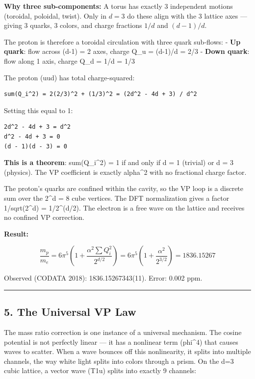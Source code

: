 \documentclass[
]{article}
\begin{document}
\textbf{Why three sub-components:} A torus has exactly 3 independent
motions (toroidal, poloidal, twist). Only in \(d=3\) do these align with
the 3 lattice axes --- giving 3 quarks, 3 colors, and charge fractions
\(1/d\) and \((d-1)/d\).

The proton is therefore a toroidal circulation with three quark
sub-flows: - \textbf{Up quark}: flow across (d-1) = 2 axes, charge Q\_u
= (d-1)/d = 2/3 - \textbf{Down quark}: flow along 1 axis, charge Q\_d =
1/d = 1/3

The proton (uud) has total charge-squared:

\begin{verbatim}
sum(Q_i^2) = 2(2/3)^2 + (1/3)^2 = (2d^2 - 4d + 3) / d^2
\end{verbatim}

Setting this equal to 1:

\begin{verbatim}
2d^2 - 4d + 3 = d^2
d^2 - 4d + 3 = 0
(d - 1)(d - 3) = 0
\end{verbatim}

\textbf{This is a theorem}: sum(Q\_i\^{}2) = 1 if and only if d = 1
(trivial) or d = 3 (physics). The VP coefficient is exactly alpha\^{}2
with no fractional charge factor.

The proton's quarks are confined within the cavity, so the VP loop is a
discrete sum over the 2\^{}d = 8 cube vertices. The DFT normalization
gives a factor 1/sqrt(2\^{}d) = 1/2\^{}(d/2). The electron is a free
wave on the lattice and receives no confined VP correction.

\textbf{Result:}

\[\frac{m_p}{m_e} = 6\pi^5 \left(1 + \frac{\alpha^2 \sum Q_i^2}{2^{d/2}}\right) = 6\pi^5 \left(1 + \frac{\alpha^2}{2^{3/2}}\right) = 1836.15267\]

Observed (CODATA 2018): 1836.15267343(11). Error: 0.002 ppm.

\begin{center}\rule{0.5\linewidth}{0.5pt}\end{center}

\subsection{5. The Universal VP Law}\label{the-universal-vp-law}

The mass ratio correction is one instance of a universal mechanism. The
cosine potential is not perfectly linear --- it has a nonlinear term
(phi\^{}4) that causes waves to scatter. When a wave bounces off this
nonlinearity, it splits into multiple channels, the way white light
splits into colors through a prism. On the d=3 cubic lattice, a vector
wave (T1u) splits into exactly 9 channels:
\end{document}
